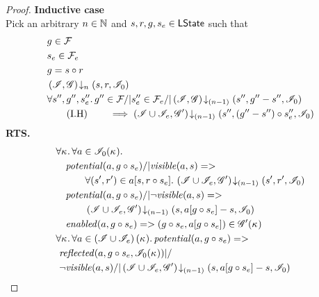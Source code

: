 \begin{lemma}
\begin{proof}
\noindent\textbf{Inductive case }\\
Pick an arbitrary $n \in \mathbb{N}$ and $s, r, g, s_e \in \textsf{LState}$ such that
%
\begin{align}
	& g \in \mathcal{F}_{} \label{LEC2:Ass1}\\
	& s_e \in \mathcal{F}_{e} \label{LEC2:Ass2}\\
	& g = s \circ r \label{LEC2:Ass3} \\
	& \left(\mathscr{I}, \mathscr{G}\right) \!\downarrow_{n} \left(s, r, \mathscr{I}_0\right) \label{LEC2:Ass4}\\
	& \forall s'', g'', s_e''.\,  g'' \in \mathcal{F}_{} /| s''_e \in \mathcal{F}_{e} /| \left(\mathscr{I}, \mathscr{G}\right) \!\downarrow_{(n-1)} \left(s'', g''-s'', \mathscr{I}_0\right) \nonumber \\
	& \tag{I.H} \qquad \implies \left(\mathscr{I} \cup \mathscr{I}_{e}, \mathscr{G}'\right) \!\downarrow_{(n-1)} \left(s'', (g''-s'') \circ s_e'', \mathscr{I}_{0}\right) \label{LEC2:IH}
\end{align}
%
\textbf{RTS.}
%
\begin{align}
	& 
	\V{\ca{}}  \V{a\in \lmod_0(\ca{})} \nonumber \\
  &\quad \m{potential}(a, g \composeL s_e) /| \m{visible}(a, s) => \nonumber\\
  & \quad\qquad\for{(s', r') \in a[s, r \composeL s_e]} \extendsAMUpto{\lmod \cup \lmod_e, \gmod'}{(n-1)}{s'}{r'}{\lmod_0} \label{LEC2:Goal0}\\
% 
	&\quad \m{potential}(a, g \composeL s_e) /| \neg\m{visible}(a, s) => \nonumber\\
  & \quad\qquad \extendsAMUpto{\lmod \cup \lmod_e, \gmod'}{(n-1)}{s}{a[g \composeL s_e] - s}{\lmod_0} \label{LEC2:Goal1}\\
%   
  &\quad \m{enabled}(a,g \composeL s_e)
  => (g \composeL s_e, a[g \composeL s_e])\in \gmod'(\ca{}) \label{LEC2:Goal2}\\
%  
  &\V{\ca{}}\V{a\in \left(\lmod \cup \lmod_e \right) (\ca{})}
  \m{potential}(a,g \composeL s_e) =>\null \nonumber \\
  &\ \m{reflected}(a, g \composeL s_e, \lmod_0(\ca{})) |/\null \nonumber \\
%  
  &\ \neg\m{visible}(a, s) /| \extendsAMUpto{\lmod \cup \lmod_e, \gmod'}{(n-1)}{s}{a[g \composeL s_e] - s}{\lmod_0}  \label{LEC2:Goal3}
\end{align}
%
%


\end{proof}
\end{lemma}
